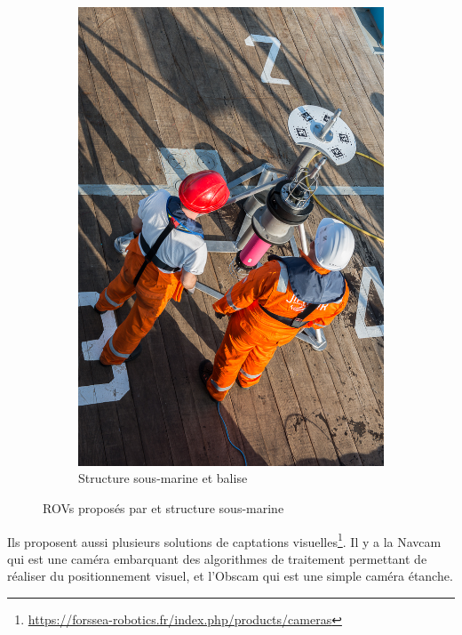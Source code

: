 \begin{figure}[!htb]
\begin{subfigure}[b]{0.3\textwidth}
					\caption{\atoll{}}
				\end{subfigure}
				\hfill
				\begin{subfigure}[b]{0.3\textwidth}
					\centering
					\includegraphics[width=\textwidth]{imgs/Frame.jpg}
					\caption{Structure sous-marine et balise}
				\end{subfigure}
				\caption{\gls{ROV}s proposés par \forssea{} et structure sous-marine}
				\label{fig:ROVs}
			\end{figure}

			Ils proposent aussi plusieurs solutions de captations visuelles\footnote{\url{https://forssea-robotics.fr/index.php/products/cameras}}. Il y a la \gls{Navcam} qui est une caméra embarquant des algorithmes de traitement permettant de réaliser du positionnement visuel, et l'\gls{Obscam} qui est une simple caméra étanche.

